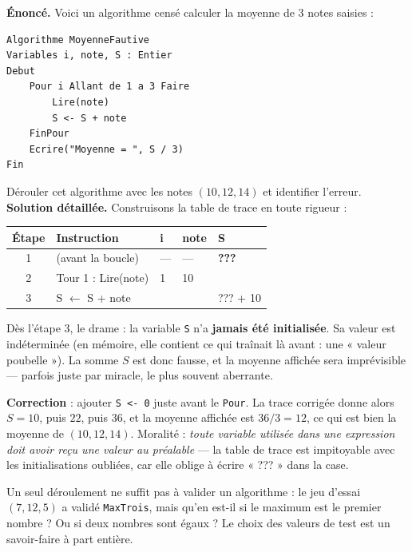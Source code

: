 \documentclass[11pt]{article}
\newcounter{popsec}
\newcounter{popsub}
\newcommand{\courssub}[1]{%
  \stepcounter{popsub}%
  \par\vspace{9pt}\noindent{\popxbold\fontsize{11.5}{13}\selectfont\color{popink}{\color{poporange}\thepopsec.\thepopsub}\hspace{6pt}#1}\par\nopagebreak\vspace{4pt}
}
\begin{document}
\begin{exoresolu}
\textbf{Énoncé.} Voici un algorithme censé calculer la moyenne de 3 notes saisies :

\begin{lstlisting}
Algorithme MoyenneFautive
Variables i, note, S : Entier
Debut
    Pour i Allant de 1 a 3 Faire
        Lire(note)
        S <- S + note
    FinPour
    Ecrire("Moyenne = ", S / 3)
Fin
\end{lstlisting}

Dérouler cet algorithme avec les notes $(10, 12, 14)$ et identifier l'erreur.
\tcblower
\textbf{Solution détaillée.} Construisons la table de trace en toute rigueur :

\begin{center}
\begin{tabularx}{0.9\linewidth}{|c|l|X|X|X|}
\hline
\rowcolor{poppinkL} \textbf{Étape} & \textbf{Instruction} & \textbf{i} & \textbf{note} & \textbf{S} \\
\hline
1 & (avant la boucle) & --- & --- & \textbf{???} \\
\hline
2 & Tour 1 : Lire(note) & 1 & 10 & \\
\hline
3 & S $\leftarrow$ S + note & & & ??? + 10 \\
\hline
\end{tabularx}
\end{center}

Dès l'étape 3, le drame : la variable \texttt{S} n'a \textbf{jamais été initialisée}. Sa valeur est indéterminée (en mémoire, elle contient ce qui traînait là avant : une « valeur poubelle »). La somme $S$ est donc fausse, et la moyenne affichée sera imprévisible — parfois juste par miracle, le plus souvent aberrante.

\textbf{Correction} : ajouter \texttt{S <- 0} juste avant le \texttt{Pour}. La trace corrigée donne alors $S = 10$, puis $22$, puis $36$, et la moyenne affichée est $36 / 3 = 12$, ce qui est bien la moyenne de $(10, 12, 14)$. Moralité : \emph{toute variable utilisée dans une expression doit avoir reçu une valeur au préalable} — la table de trace est impitoyable avec les initialisations oubliées, car elle oblige à écrire « ??? » dans la case.
\end{exoresolu}

\courssub{Choisir de bons jeux d'essai}

Un seul déroulement ne suffit pas à valider un algorithme : le jeu d'essai $(7, 12, 5)$ a validé \texttt{MaxTrois}, mais qu'en est-il si le maximum est le premier nombre ? Ou si deux nombres sont égaux ? Le choix des valeurs de test est un savoir-faire à part entière.
\end{document}
